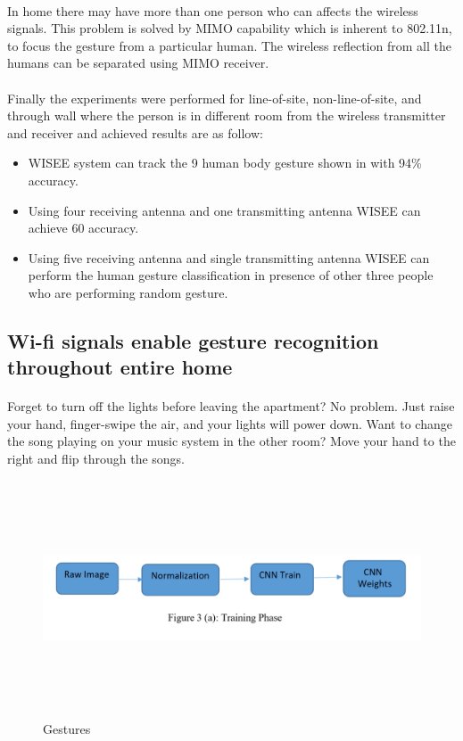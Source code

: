 \documentclass[a4paper,12pt,oneside]{article}
\begin{document}
\paragraph{}
In home there may have more than one person who can affects the wireless signals. This
problem is solved by MIMO capability which is inherent to 802.11n, to focus the gesture from a
particular human. The wireless reflection from all the humans can be separated using MIMO
receiver.
\paragraph{}
Finally the experiments were performed for line-of-site, non-line-of-site, and through
wall where the person is in different room from the wireless transmitter and receiver and
achieved results are as follow:
\begin{itemize}
    \item WISEE system can track the 9 human body gesture shown in with 94\% accuracy.
    \item  Using four receiving antenna and one transmitting antenna WISEE can achieve 60%
accuracy.
    \item Using five receiving antenna and single transmitting antenna WISEE can perform the
human gesture classification in presence of other three people who are performing
random gesture.
\end{itemize}

\subsection{Wi-fi signals enable gesture recognition throughout entire home}
\paragraph{}
Forget to turn off the lights before leaving the apartment? No problem. Just raise your
hand, finger-swipe the air, and your lights will power down. Want to change the song playing on
your music system in the other room? Move your hand to the right and flip through the songs.

\begin{figure}[H]
\centering
\includegraphics[height=7cm,width=13cm]{3.png}
\caption{Gestures}
\end{figure}
\end{document}
